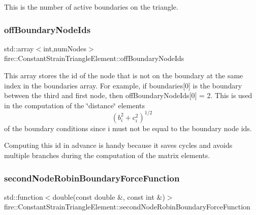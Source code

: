 This is the number of active boundaries on the triangle. \mbox{\label{a00789_ac9e146872421c7dbd60e08f887b0cfc0}} 
\subsubsection{\texorpdfstring{off\+Boundary\+Node\+Ids}{offBoundaryNodeIds}}
{\footnotesize\ttfamily std\+::array$<$int,num\+Nodes$>$ fire\+::\+Constant\+Strain\+Triangle\+Element\+::off\+Boundary\+Node\+Ids\hspace{0.3cm}{\ttfamily [protected]}}

This array stores the id of the node that is not on the boundary at the same index in the boundaries array. For example, if boundaries\mbox{[}0\mbox{]} is the boundary between the third and first node, then off\+Boundary\+Node\+Ids\mbox{[}0\mbox{]} = 2. This is used in the computation of the \char`\"{}distance\char`\"{} elements \[ (b_{i}^{2} + c_{i}^{2})^{1/2} \] of the boundary conditions since i must not be equal to the boundary node ids.

Computing this id in advance is handy because it saves cycles and avoids multiple branches during the computation of the matrix elements. \mbox{\label{a00789_a22fbf7cade7bab565c03e86ee8dc5697}} 
\subsubsection{\texorpdfstring{second\+Node\+Robin\+Boundary\+Force\+Function}{secondNodeRobinBoundaryForceFunction}}
{\footnotesize\ttfamily std\+::function$<$double(const double \&, const int \&)$>$ fire\+::\+Constant\+Strain\+Triangle\+Element\+::second\+Node\+Robin\+Boundary\+Force\+Function\hspace{0.3cm}{\ttfamily [protected]}}

